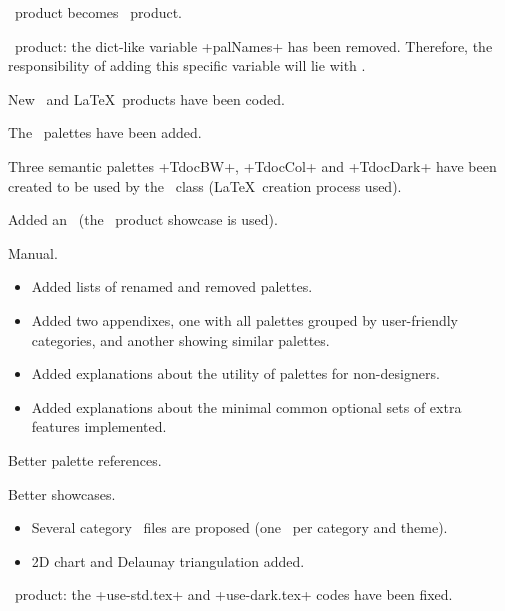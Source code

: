 \documentclass{tutodoc}
\begin{document}
\small


\begin{tdocbreak}
    \item \LUADRAW\ product becomes \lua\ product.


    \item \lua\ product: the dict-like variable +palNames+ has been removed. Therefore, the responsibility of adding this specific variable will lie with \LUADRAW.
\end{tdocbreak}


\begin{tdocnew}
    \item New \css\ and \LaTeX\ products have been coded.


    \item The \palettable\ palettes have been added.


    \item Three semantic palettes +TdocBW+, +TdocCol+ and +TdocDark+ have been created to be used by the \tutodoc\ class (\LaTeX\ creation process used).


    \item Added an \thisdemo\ (the \css\ product showcase is used).
\end{tdocnew}


\begin{tdocupdate}
    \item Manual.
    \begin{itemize}
        \item Added lists of renamed and removed palettes.

        \item Added two appendixes, one with all palettes grouped by user-friendly categories, and another showing similar palettes.

        \item Added explanations about the utility of palettes for non-designers.

        \item Added explanations about the minimal common optional sets of extra features implemented.
    \end{itemize}


    \item Better palette references.

    \item Better showcases.
    \begin{itemize}
        \item Several category \pdf\ files are proposed (one \pdf\ per category and theme).

        \item 2D chart and Delaunay triangulation added.
    \end{itemize}
\end{tdocupdate}


\begin{tdocfix}
    \item \lua\ product: the +use-std.tex+ and +use-dark.tex+ codes have been fixed.
\end{tdocfix}
\end{document}

